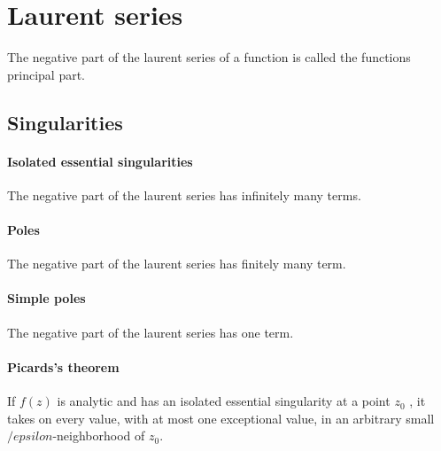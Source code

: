 \section{Laurent series}
The negative part of the laurent series of a function is called the
functions principal part.

\subsection{Singularities}

\paragraph{Isolated essential singularities}
The negative part of the laurent series has infinitely many terms.

\paragraph{Poles}
The negative part of the laurent series has finitely many term.

\paragraph{Simple poles}
The negative part of the laurent series has one term.

\paragraph{Picards's theorem}
If $f(z)$ is analytic and has an isolated essential singularity at a
point $z_0$ , it takes on every value, with at most one exceptional
value, in an arbitrary small $/epsilon$-neighborhood of $z_0$.
